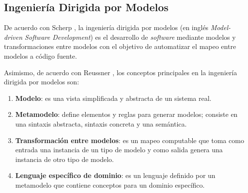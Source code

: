 \subsection{Ingeniería Dirigida por Modelos}

De acuerdo con Scherp \cite{scherp_framework_2013}, la ingeniería dirigida por modelos (en inglés \textit{Model-driven Software Development}) es el desarrollo de \textit{software} mediante modelos y transformaciones entre modelos con el objetivo de automatizar el mapeo entre modelos a código fuente.

Asimismo, de acuerdo con Reussner \cite{reussner_handbuch_2006}, los conceptos principales en la ingeniería dirigida por modelos son:

\begin{enumerate}
  \item \textbf{Modelo}: es una vista simplificada y abstracta de un sistema real. 
  \item \textbf{Metamodelo}: define elementos y reglas para generar modelos; consiste en una sintaxis abstracta, sintaxis concreta y una semántica.
  \item \textbf{Transformación entre modelos}: es un mapeo computable que toma como entrada una instancia de un tipo de modelo y como salida genera una instancia de otro tipo de modelo.
  \item \textbf{Lenguaje específico de dominio}: es un lenguaje definido por un metamodelo que contiene conceptos para un dominio específico.
\end{enumerate}